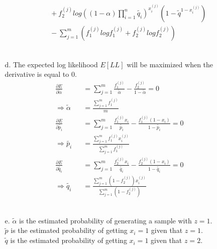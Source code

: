 \begin{enumerate}
\begin{enumerate}
\begin{eqnarray}
		&& \:\:\:\:+ f_2^{(j)} log((1 - \alpha) \prod_{i=1}^{n} \tilde{q_i})^{x_i^{(j)}} (1- \tilde{q}^{1-x_i^{(j)}})\\
		&& \:\:\:\: - \sum_{j=1}^{m} (f_1^{(j)} log f_1^{(j)} + f_2^{(j)} log f_2^{(j)})
	\end{eqnarray}\\
	\item[d.] The expected log likelihood $E[LL]$ will be maximized when the derivative is equal to $0$.
	\begin{eqnarray}
		\frac{\partial E}{\partial \tilde{\alpha}} && = \sum_{j=1}^{m} \frac{f_1^{(j)}}{\tilde{\alpha}} - \frac{f_2^{(j)}}{1-\tilde{\alpha}} = 0\\
		\Rightarrow \tilde{\alpha} && = \frac{\sum_{j=1}^{m} f_1^{(j)}}{m} \\
		\frac{\partial E}{\partial \tilde{p_i}} && = \sum_{j=1}^{m} \frac{f_1^{(j)} x_i}{\tilde{p_i}} - \frac{f_1^{(j)} (1-x_i)}{1-\tilde{p_i}} = 0\\
		\Rightarrow \tilde{p_i} && = \frac{\sum_{j=1}^{m} f_1^{(j)} x_i^{(j)}}{\sum_{j=1}^{m} f_1^{(j)}} \\
		\frac{\partial E}{\partial \tilde{q_i}} && = \sum_{j=1}^{m} \frac{f_2^{(j)} x_i}{\tilde{q_i}} - \frac{f_2^{(j)} (1-x_i)}{1-\tilde{q_i}} = 0\\
		\Rightarrow \tilde{q_i} && = \frac{\sum_{j=1}^{m} (1-f_2^{(j)}) x_i^{(j)}}{\sum_{j=1}^{m} (1-f_2^{(j)})}
	\end{eqnarray}\\
	\newpage
	\item[e.] $\tilde{\alpha}$ is the estimated probability of generating a sample with $z=1$.\\
		$\tilde{p}$ is the estimated probability of getting $x_i = 1$ given that $z=1$.\\
		$\tilde{q}$ is the estimated probability of getting $x_i = 1$ given that $z=2$.

\end{enumerate}
\end{enumerate}
